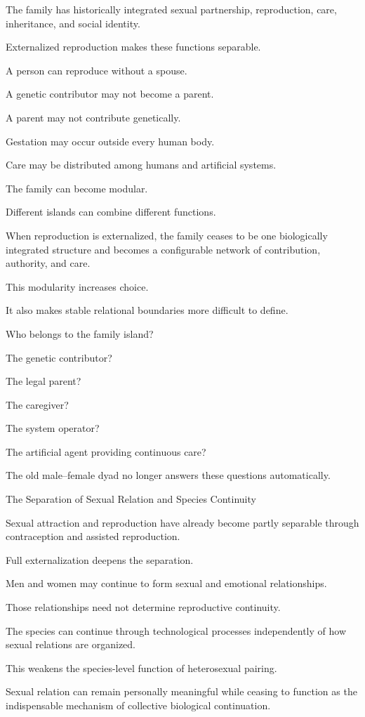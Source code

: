 The family has historically integrated sexual partnership, reproduction, care, inheritance, and social identity.

Externalized reproduction makes these functions separable.

A person can reproduce without a spouse.

A genetic contributor may not become a parent.

A parent may not contribute genetically.

Gestation may occur outside every human body.

Care may be distributed among humans and artificial systems.

The family can become modular.

Different islands can combine different functions.

When reproduction is externalized, the family ceases to be one biologically integrated structure and becomes a configurable network of contribution, authority, and care.

This modularity increases choice.

It also makes stable relational boundaries more difficult to define.

Who belongs to the family island?

The genetic contributor?

The legal parent?

The caregiver?

The system operator?

The artificial agent providing continuous care?

The old male–female dyad no longer answers these questions automatically.

The Separation of Sexual Relation and Species Continuity

Sexual attraction and reproduction have already become partly separable through contraception and assisted reproduction.

Full externalization deepens the separation.

Men and women may continue to form sexual and emotional relationships.

Those relationships need not determine reproductive continuity.

The species can continue through technological processes independently of how sexual relations are organized.

This weakens the species-level function of heterosexual pairing.

Sexual relation can remain personally meaningful while ceasing to function as the indispensable mechanism of collective biological continuation.

